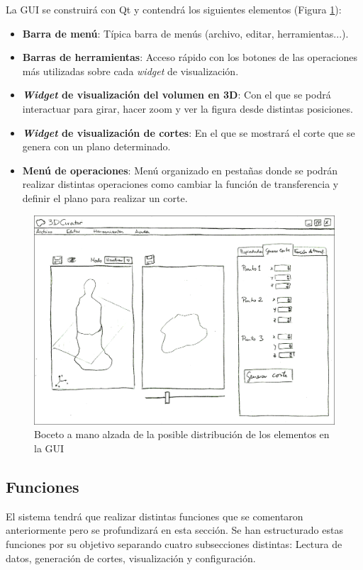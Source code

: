 	La GUI se construirá con Qt y contendrá los siguientes elementos (Figura \ref{fig:basic_gui}):
	\begin{itemize}
		\item \textbf{Barra de menú}: Típica barra de menús (archivo, editar, herramientas...).
		\item \textbf{Barras de herramientas}: Acceso rápido con los botones de las operaciones más utilizadas sobre cada \textit{widget} de visualización.
		\item \textbf{\textit{Widget} de visualización del volumen en 3D}: Con el que se podrá interactuar para girar, hacer zoom y ver la figura desde distintas posiciones.
		\item \textbf{\textit{Widget} de visualización de cortes}: En el que se mostrará el corte que se genera con un plano determinado.
		\item \textbf{Menú de operaciones}: Menú organizado en pestañas donde se podrán realizar distintas operaciones como cambiar la función de transferencia y definir el plano para realizar un corte.
	\end{itemize}
	
	\begin{figure}[H]
		\centering
		\includegraphics[width=12.5cm]{imagenes/basic_gui}
		\caption{Boceto a mano alzada de la posible distribución de los elementos en la GUI}
		\label{fig:basic_gui}
	\end{figure}
	
	\subsection{Funciones}
	
	El sistema tendrá que realizar distintas funciones que se comentaron anteriormente pero se profundizará en esta sección. Se han estructurado estas funciones por su objetivo separando cuatro subsecciones distintas: Lectura de datos, generación de cortes, visualización y configuración.
	
